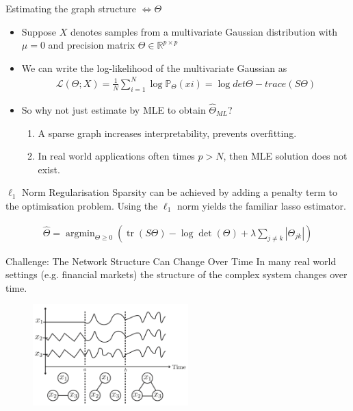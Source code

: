 \documentclass{beamer}
\begin{document}
\begin{frame}{Estimating the graph structure $\Leftrightarrow \Theta$}
  \begin{itemize}
      \item Suppose $X$ denotes samples from a multivariate Gaussian distribution with $\mu = 0$ and precision matrix $\Theta \in \mathbb{R}^{p \times p}$
    \item We can write the log-likelihood of the multivariate Gaussian as
    \begin{align*}
    	\mathcal{L}(\Theta; X) = \frac{1}{N} \sum_{i=1}^N \log \mathbb{P}_{\Theta}(xi) = \log det \Theta - trace (S \Theta)
    \end{align*}
    \item So why not just estimate by MLE to obtain $\widehat{\Theta}_{ML}$?
    \begin{enumerate}
    	\item A sparse graph increases interpretability, prevents overfitting.
    	\item In real world applications often times $p > N$, then MLE solution does not exist.
    \end{enumerate}
  \end{itemize}
\end{frame}

\begin{frame}{$\ell_1$ Norm Regularisation}
Sparsity can be achieved by adding a penalty term to the optimisation problem. Using the $\ell_1$ norm yields the familiar lasso estimator.

\begin{align*}
    \hat{\Theta}=\operatorname{argmin}_{\Theta \geq 0}\left(\operatorname{tr}(S \Theta)-\log \operatorname{det}(\Theta)+\lambda \sum_{j \neq k}\left|\Theta_{j k}\right|\right)
\end{align*}

\end{frame}


\begin{frame}{Challenge: The Network Structure Can Change Over Time}
    In many real world settings (e.g. financial markets) the structure of the complex system changes over time.
    \begin{figure}
       \includegraphics[width=6cm]{network_evolution}
       \caption{}
       \label{fig:network_evolution}
  \end{figure}
\end{frame}
\end{document}
